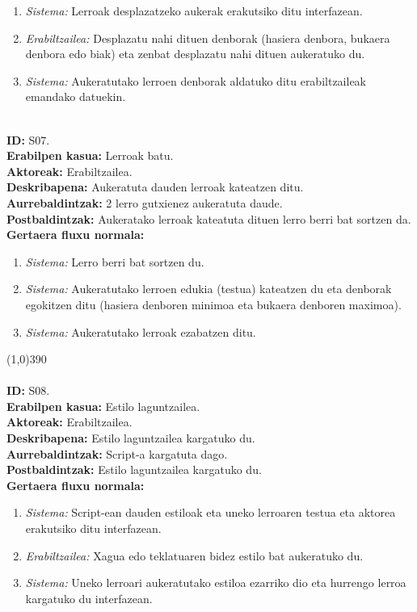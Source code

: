 \begin{enumerate}
	\item \textit{Sistema:} Lerroak desplazatzeko aukerak erakutsiko ditu interfazean.
	\item \textit{Erabiltzailea:} Desplazatu nahi dituen denborak (hasiera denbora, bukaera denbora edo biak) eta zenbat desplazatu nahi dituen aukeratuko du.
	\item \textit{Sistema:} Aukeratutako lerroen denborak aldatuko ditu erabiltzaileak emandako datuekin.
\end{enumerate}
\noindent\\
\textbf{ID:} S07.\\
\textbf{Erabilpen kasua:} Lerroak batu.\\
\textbf{Aktoreak:} Erabiltzailea.\\
\textbf{Deskribapena:} Aukeratuta dauden lerroak kateatzen ditu.\\
\textbf{Aurrebaldintzak:} 2 lerro gutxienez aukeratuta daude.\\
\textbf{Postbaldintzak:} Aukeratako lerroak kateatuta dituen lerro berri bat sortzen da.\\
\textbf{Gertaera fluxu normala:}
\begin{enumerate}
	\item \textit{Sistema:} Lerro berri bat sortzen du.
	\item \textit{Sistema:} Aukeratutako lerroen edukia (testua) kateatzen du eta denborak egokitzen ditu (hasiera denboren minimoa eta bukaera denboren maximoa).
	\item \textit{Sistema:} Aukeratutako lerroak ezabatzen ditu.
\end{enumerate}
\line(1,0){390}\\
\noindent\\
\textbf{ID:} S08.\\
\textbf{Erabilpen kasua:} Estilo laguntzailea.\\
\textbf{Aktoreak:} Erabiltzailea.\\
\textbf{Deskribapena:} Estilo laguntzailea kargatuko du.\\
\textbf{Aurrebaldintzak:} Script-a kargatuta dago.\\
\textbf{Postbaldintzak:} Estilo laguntzailea kargatuko du.\\
\textbf{Gertaera fluxu normala:}
\begin{enumerate}
	\item \textit{Sistema:} Script-ean dauden estiloak eta uneko lerroaren testua eta aktorea erakutsiko ditu interfazean.
	\item \textit{Erabiltzailea:} Xagua edo teklatuaren bidez estilo bat aukeratuko du.
	\item \textit{Sistema:} Uneko lerroari aukeratutako estiloa ezarriko dio eta hurrengo lerroa kargatuko du interfazean.
\end{enumerate}
